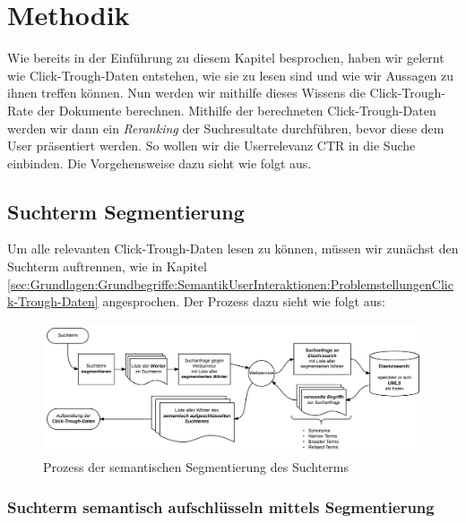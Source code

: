 
\section{Methodik}
\label{sec:Reranking:Methodik}

Wie bereits in der Einführung zu diesem Kapitel besprochen, haben wir gelernt wie Click-Trough-Daten entstehen, wie sie zu lesen sind und wie wir Aussagen zu ihnen treffen können. Nun werden wir mithilfe dieses Wissens die Click-Trough-Rate der Dokumente berechnen. Mithilfe der berechneten Click-Trough-Daten werden wir dann ein \textit{Reranking} der Suchresultate durchführen, bevor diese dem User präsentiert werden. So wollen wir die Userrelevanz CTR in die Suche einbinden. Die Vorgehensweise dazu sieht wie folgt aus.

\subsection{Suchterm Segmentierung}
\label{sec:Reranking:Methodik:SuchtermSegmentierung}

Um alle relevanten Click-Trough-Daten lesen zu können, müssen wir zunächst den Suchterm auftrennen, wie in Kapitel \ref{sec:Grundlagen:Grundbegriffe:SemantikUserInteraktionen:ProblemstellungenClick-Trough-Daten} angesprochen. Der Prozess dazu sieht wie folgt aus:

\begin{figure}[H]
\centering
\vspace{-1em}
\caption[Prozess der semantischen Segmentierung des Suchterms]{Prozess der semantischen Segmentierung des Suchterms}
\label{fig:SemantischeSegmentierung}
\includegraphics[width=\linewidth]{gfx/SuchtermSegmentierung}
\vspace{-2em}
\end{figure} 

\subsubsection{Suchterm semantisch aufschlüsseln mittels Segmentierung}
\label{sec:Reranking:Methodik:SuchtermSegmentierung:SuchtermSegmentierung}

